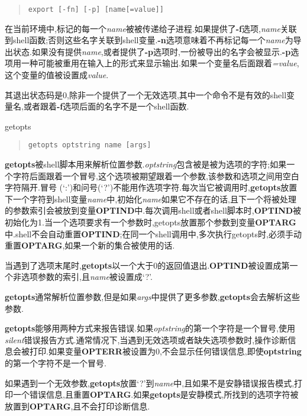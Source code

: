 \documentclass[draft,openany]{book}
\begin{document}
\begin{CJK}{UTF8}{gbsn}
\begin{basedescript}{\desclabelstyle{\nextlinelabel}\desclabelwidth{2.5em}}
        \begin{quote}
            \verb+export [-fn] [-p] [name[=value]]+
        \end{quote}
        在当前环境中,标记的每一个\emph{name}被被传递给子进程.如果提供了\textbf{-f}选项,\emph{name}关联到shell函数;否则这些名字关联到shell变量.\textbf{-n}选项意味着不再标记每一个\emph{name}为导出状态.如果没有提供\emph{name},或者提供了\textbf{-p}选项时,一份被导出的名字会被显示.\textbf{-p}选项用一种可能被重用在输入上的形式来显示输出.如果一个变量名后面跟着\emph{=value},这个变量的值被设置成\emph{value}.\par
        其退出状态码是0,除非一个提供了一个无效选项,其中一个命令不是有效的shell变量名,或者跟着\textbf{-f}选项后面的名字不是一个shell函数.
    \item[getopts]
        \begin{quote}
            \verb+getopts optstring name [args]+
        \end{quote}
        \textbf{getopts}被shell脚本用来解析位置参数.\emph{optstring}包含被是被为选项的字符;如果一个字符后面跟着一个冒号,这个选项被期望跟着一个参数,该参数和选项之间用空白字符隔开.冒号 (`:')和问号(`?')不能用作选项字符.每次当它被调用时,\textbf{getopts}放置下一个字符到shell变量\emph{name}中,初始化\emph{name}如果它不存在的话,且下一个将被处理的参数索引会被放到变量\textbf{OPTIND}中.每次调用shell或者shell脚本时,\textbf{OPTIND}被初始化为1.当一个选项要求有一个参数时,getopts放置那个参数到变量\textbf{OPTARG}中.shell不会自动重置\textbf{OPTIND};在同一个shell调用中,多次执行getopts时,必须手动重置\textbf{OPTARG},如果一个新的集合被使用的话.\par
        当遇到了选项末尾时,\textbf{getopts}以一个大于0的返回值退出.\textbf{OPTIND}被设置成第一个非选项参数的索引,且\emph{name}被设置成`?'.\par
        \textbf{getopts}通常解析位置参数,但是如果\emph{args}中提供了更多参数,\textbf{getopts}会去解析这些参数.\par
        \textbf{getopts}能够用两种方式来报告错误.如果\emph{optstring}的第一个字符是一个冒号,使用\emph{silent}错误报告方式.通常情况下,当遇到无效选项或者缺失选项参数时,操作诊断信息会被打印.如果变量\textbf{OPTERR}被设置为0,不会显示任何错误信息,即使\textbf{optstring}的第一个字符不是一个冒号.\par
        如果遇到一个无效参数,\textbf{getopts}放置`?'到\emph{name}中,且如果不是安静错误报告模式,打印一个错误信息,且重置\textbf{OPTARG}.如果\textbf{getopts}是安静模式,所找到的选项字符被放置到\textbf{OPTARG},且不会打印诊断信息.\par

\end{basedescript}
\end{CJK}
\end{document}
